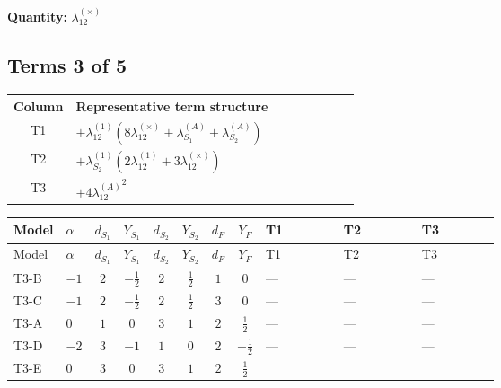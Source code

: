 \documentclass[8pt]{article}
\begin{document}
\begin{landscape}
\begin{longtable}{@{}llcccccc >{\raggedright\arraybackslash}p{0.21\linewidth} >{\raggedright\arraybackslash}p{0.21\linewidth} >{\raggedright\arraybackslash}p{0.21\linewidth}@{}}
\midrule
\bottomrule
\end{longtable}
\clearpage
\noindent\textbf{Quantity: }$\lambda_{12}^{(\times)}$\par\smallskip
\subsection*{Terms 3 of 5}
\begin{center}
\begin{tabular}{@{}c >{\raggedright\arraybackslash}p{0.82\linewidth}@{}}
\toprule
Column & Representative term structure \\
\midrule
T1 & \(\displaystyle +{\lambda_{12}^{(1)}} (8 {\lambda_{12}^{(\times)}}+{\lambda_{S_1}^{(A)}}+{\lambda_{S_2}^{(A)}})\) \\
\midrule
T2 & \(\displaystyle +{\lambda_{S_2}^{(1)}} (2 {\lambda_{12}^{(1)}}+3 {\lambda_{12}^{(\times)}})\) \\
\midrule
T3 & \(\displaystyle +4 {\lambda_{12}^{(A)}}^2\) \\
\midrule
\bottomrule
\end{tabular}
\end{center}
\smallskip
\tiny
\begin{longtable}{@{}llcccccc >{\raggedright\arraybackslash}p{0.21\linewidth} >{\raggedright\arraybackslash}p{0.21\linewidth} >{\raggedright\arraybackslash}p{0.21\linewidth}@{}}
\toprule
Model & $\alpha$ & $d_{S_1}$ & $Y_{S_1}$ & $d_{S_2}$ & $Y_{S_2}$ & $d_F$ & $Y_F$ & T1 & T2 & T3 \\
\midrule
\endfirsthead
\toprule
Model & $\alpha$ & $d_{S_1}$ & $Y_{S_1}$ & $d_{S_2}$ & $Y_{S_2}$ & $d_F$ & $Y_F$ & T1 & T2 & T3 \\
\midrule
\endhead
T3-B & $-1$ & $2$ & $-\frac{1}{2}$ & $2$ & $\frac{1}{2}$ & $1$ & $0$ & --- & --- & --- \\
\midrule
T3-C & $-1$ & $2$ & $-\frac{1}{2}$ & $2$ & $\frac{1}{2}$ & $3$ & $0$ & --- & --- & --- \\
\midrule
T3-A & $0$ & $1$ & $0$ & $3$ & $1$ & $2$ & $\frac{1}{2}$ & --- & --- & --- \\
\midrule
T3-D & $-2$ & $3$ & $-1$ & $1$ & $0$ & $2$ & $-\frac{1}{2}$ & --- & --- & --- \\
\midrule
T3-E & $0$ & $3$ & $0$ & $3$ & $1$ & $2$ & $\frac{1}{2}$ & \scriptsize\adjustbox{max width=\linewidth}{$\begin{gathered} +{\lambda_{12}^{(1)}} (8 {\lambda_{12}^{(\times)}}+{\lambda_{S_1}^{(A)}}+{\lambda_{S_2}^{(A)}})\end{gathered}$} & \scriptsize\adjustbox{max width=\linewidth}{$\begin{gathered} +{\lambda_{S_2}^{(1)}} (2 {\lambda_{12}^{(1)}}+3 {\lambda_{12}^{(\times)}})\end{gathered}$} & \scriptsize\adjustbox{max width=\linewidth}{$\begin{gathered} +4 {\lambda_{12}^{(A)}}^2\end{gathered}$} \\

\end{longtable}
\end{landscape}
\end{document}
